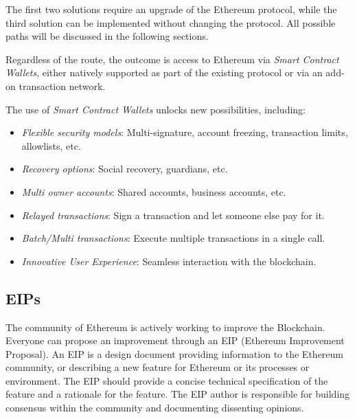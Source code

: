 The first two solutions require an upgrade of the Ethereum protocol, while the third solution can be implemented without changing the protocol.\cite{ethereum-account-abstraction} All possible paths will be discussed in the following sections.

Regardless of the route, the outcome is access to Ethereum via \textit{Smart Contract Wallets}, either natively supported as part of the existing protocol or via an add-on transaction network.  \cite{ethereum-account-abstraction}

The use of \textit{Smart Contract Wallets}  unlocks new possibilities, including: \cite{ethereum-account-abstraction}
\begin{itemize}
    \item \textit{Flexible security models}: Multi-signature, account freezing, transaction limits, allowlists, etc.
    \item \textit{Recovery options}: Social recovery, guardians, etc.
    \item \textit{Multi owner accounts}: Shared accounts, business accounts, etc.
    \item \textit{Relayed transactions}: Sign a transaction and let someone else pay for it.
    \item \textit{Batch/Multi transactions}: Execute multiple transactions in a single call.
    \item \textit{Innovative User Experience}: Seamless interaction with the blockchain.
\end{itemize}


\subsection{EIPs}
\label{subsec:eips}

The community of Ethereum is actively working to improve the Blockchain. Everyone can propose an improvement through an EIP (Ethereum Improvement Proposal). An EIP is a design document providing information to the Ethereum community, or describing a new feature for Ethereum or its processes or environment. The EIP should provide a concise technical specification of the feature and a rationale for the feature. The EIP author is responsible for building consensus within the community and documenting dissenting opinions. \cite{eip-1}

